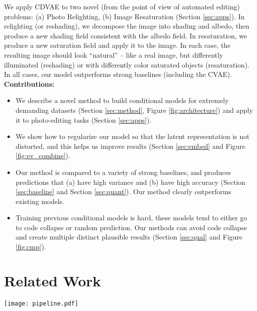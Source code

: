 \documentclass[10pt,twocolumn,letterpaper]{article}
\begin{document}
We apply CDVAE to two novel (from the point of view of automated editing) problems: (a) Photo Relighting, 
(b) Image Resaturation (Section \ref{sec:apps}). In relighting (or reshading), we decompose the image into shading and albedo, then produce a new shading 
field consistent with the albedo field. In resaturation, we produce a new saturation field and 
apply it to the image.  In each case, the resulting image should look ``natural'' -- like 
a real image, but differently illuminated (reshading) or with differently color saturated objects 
(resaturation).  In all cases, our model outperforms strong baselines 
(including the CVAE). \\


{\bf Contributions:}
\begin{itemize}
\item We describe a novel method to build conditional models for extremely demanding 
datasets (Section \ref{sec:method}, Figure \ref{fig:architecture}) and apply it to
photo-editing tasks (Section \ref{sec:apps}).  
\item We show how to regularize our model so that the latent representation is not distorted, and this helps us 
improve results (Section \ref{sec:embed} and Figure \ref{fig:ev_combine}). 
\item Our method is compared to a variety of strong baselines, and produces predictions that (a) have high variance and
  (b) have high accuracy (Section \ref{sec:baseline} and Section \ref{sec:quant}). Our method clearly outperforms existing models.
\item Training previous conditional models is hard, these models tend to either go to code collapse 
or random prediction. Our methods can avoid code collapse and create multiple distinct plausible results 
(Section \ref{sec:qual} and Figure \ref{fig:cmp}). 
\end{itemize}

\section{Related Work}

\begin{figure*}[ht]
\centerline{  \texttt{[image: pipeline.pdf]}}
  \caption{{\bf Left} Our training architecture for CDVAE; and {\bf Right} Test-time architecture
   of CDVAE. We use two deep variational autoencoders (DVAE), one for the conditioning image $x_c$ and 
   another for generated image $x_g$. Each DVAE has two layers of latent gaussian variables and we 
   use the ladder VAE architecture of \cite{sonderby2016ladder}. Embedding guidance introduces
   metric constraints on the code space $z_c$ to prevent code collapse. And, MDN models the multimodal
   distribution between $z_g$ and $z_c$. During test, we sample multiple $z_g$ from MDN for a given 
   input. We decode these different $z_g$ to obtain multiple predictions.}
  \label{fig:architecture}
\end{figure*}
\end{document}
